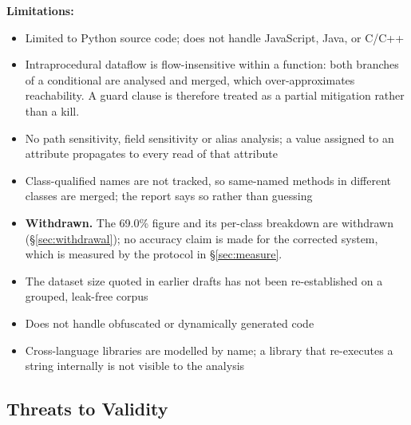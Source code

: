 \documentclass[12pt,a4paper]{article}
\begin{document}
\textbf{Limitations:}
\begin{itemize}
    \item Limited to Python source code; does not handle JavaScript, Java, or C/C++
    \item Intraprocedural dataflow is flow-insensitive within a function: both
    branches of a conditional are analysed and merged, which over-approximates
    reachability. A guard clause is therefore treated as a partial mitigation
    rather than a kill.
    \item No path sensitivity, field sensitivity or alias analysis; a value
    assigned to an attribute propagates to every read of that attribute
    \item Class-qualified names are not tracked, so same-named methods in
    different classes are merged; the report says so rather than guessing
    \item \textbf{Withdrawn.} The 69.0\% figure and its per-class breakdown are
    withdrawn (\S\ref{sec:withdrawal}); no accuracy claim is made for the
    corrected system, which is measured by the protocol in \S\ref{sec:measure}.
    \item The dataset size quoted in earlier drafts has not been re-established on
    a grouped, leak-free corpus
    \item Does not handle obfuscated or dynamically generated code
    \item Cross-language libraries are modelled by name; a library that re-executes
    a string internally is not visible to the analysis
\end{itemize}

\subsection{Threats to Validity}
\end{document}
